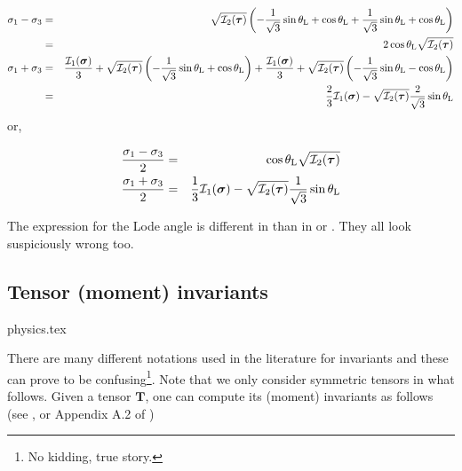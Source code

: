 \begin{eqnarray}
\sigma_1 -\sigma_3
&=&  \sqrt{{\cal I}_2({\bm \tau})} \left( 
-\frac{1}{\sqrt{3}}\sin \theta_{\rm L}  + \cos \theta_{\rm L} 
+\frac{1}{\sqrt{3}}\sin \theta_{\rm L}  + \cos \theta_{\rm L} \right) \nonumber\\
&=& 2 \cos \theta_{\rm L} \sqrt{{\cal I}_2({\bm \tau})} \\ 
\sigma_1 + \sigma_3 
&=&   
\frac{{\cal I}_1({\bm \sigma})}{3} + \sqrt{{\cal I}_2({\bm \tau})} \left(-\frac{1}{\sqrt{3}}\sin 
\theta_{\rm L}  + \cos \theta_{\rm L} \right)   
+\frac{{\cal I}_1({\bm \sigma})}{3} + \sqrt{{\cal I}_2({\bm \tau})} \left(-\frac{1}{\sqrt{3}}\sin 
\theta_{\rm L}  - \cos \theta_{\rm L} \right)   
 \nonumber\\
&=& 
\frac{2}{3} {\cal I}_1({\bm \sigma}) -\sqrt{ {\cal I}_2({\bm \tau})} \frac{2}{\sqrt{3}}\sin \theta_{\rm L} 
\end{eqnarray}
or, 
\begin{mdframed}[backgroundcolor=blue!5]
\begin{eqnarray}
\frac{\sigma_1 -\sigma_3}{2} &=&  \cos \theta_{\rm L} \sqrt{{\cal I}_2({\bm \tau})}  \label{eq:sig13a} \\
\frac{\sigma_1 + \sigma_3}{2} &=& \frac{1}{3} {\cal I}_1({\bm \sigma}) -\sqrt{{\cal I}_2({\bm \tau})} \frac{1}{\sqrt{3}}\sin \theta_{\rm L} \label{eq:sig13b}
\end{eqnarray}
\end{mdframed}



\begin{remark}
The expression for the Lode angle is different in \cite[p101]{book_zitf} than in \cite{zico74} or \cite[p62]{zita2}. They all look suspiciously wrong too.
\end{remark}


\subsection{Tensor (moment) invariants}\label{sec:invariants}
\begin{flushright} {\tiny {\color{gray} physics.tex}} \end{flushright}


There are many different notations used in the literature for invariants 
and these can prove to be 
confusing\footnote{No kidding, true story.}. Note that we only consider symmetric tensors in what follows.
Given a tensor $\bm{T}$,  one can compute its (moment) invariants as follows 
(see \cite[p.339]{reddybook2}, or Appendix A.2 of \cite{zita2})

